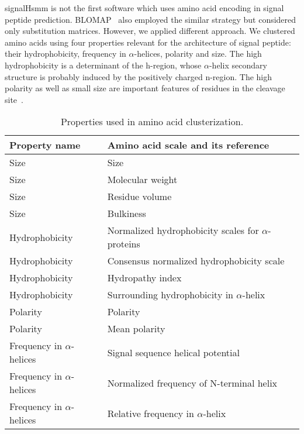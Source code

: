\documentclass[10pt,letterpaper]{article}
\begin{document}
signalHsmm is not the first software which uses amino acid encoding in signal peptide prediction. BLOMAP~\cite{maetschke2005blomap} also employed the similar strategy but considered only substitution matrices. However, we applied different approach. We clustered amino acids using four properties relevant for the architecture of signal peptide: their hydrophobicity, frequency in $\alpha$-helices, polarity and size. The high hydrophobicity is a determinant of the h-region, whose $\alpha$-helix secondary structure is probably induced by the positively charged n-region. The high polarity as well as small size are important features of residues in the cleavage site~\cite{1994palzkillselection}.

\begin{table}[ht]
\small
\centering
\caption{Properties used in amino acid clusterization.} 
\begin{tabular}{ll}
  \toprule
Property name & Amino acid scale and its reference \\ 
  \midrule
Size & Size~\cite{dawson1972size} \\ 
   \rowcolor[gray]{0.85}Size & Molecular weight~\cite{fasman1976handbook}\\ 
  Size & Residue volume~\cite{1973goldsackcontribution} \\ 
   \rowcolor[gray]{0.85}Size & Bulkiness~\cite{1968zimmermanthe} \\ 
  Hydrophobicity & Normalized hydrophobicity scales for $\alpha$-proteins~\cite{1992cidhydrophobicity} \\ 
   \rowcolor[gray]{0.85}Hydrophobicity & Consensus normalized hydrophobicity scale~\cite{1984eisenbergthreedimensional} \\ 
  Hydrophobicity & Hydropathy index~\cite{1982kytea} \\ 
   \rowcolor[gray]{0.85}Hydrophobicity & Surrounding hydrophobicity in $\alpha$-helix~\cite{1980ponnuswamyhydrophobic} \\ 
  Polarity & Polarity~\cite{1974granthamamino} \\ 
   \rowcolor[gray]{0.85}Polarity & Mean polarity~\cite{1988radzickainfluences} \\ 
  Frequency in $\alpha$-helices & Signal sequence helical potential~\cite{1982argosstructural} \\ 
   \rowcolor[gray]{0.85}Frequency in $\alpha$-helices & Normalized frequency of N-terminal helix~\cite{chou1978prediction} \\ 
  Frequency in $\alpha$-helices & Relative frequency in $\alpha$-helix~\cite{1990prabhakaranthe} \\ 
   \bottomrule
\end{tabular}
\label{tab:aaprop}
\end{table}
\end{document}
